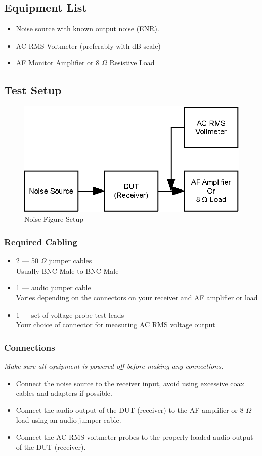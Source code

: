 \documentclass[10pt,letterpaper]{book}
\begin{document}
\subsection*{Equipment List}
\begin{itemize}
	\item Noise source with known output noise (ENR).
	\item AC RMS Voltmeter (preferably with dB scale)
	\item AF Monitor Amplifier or 8 $\Omega$ Resistive Load
\end{itemize}
\subsection*{Test Setup}
\begin{figure}[h]
\centering
\includegraphics[scale=1]{Illustrations/NFSetup}
\caption{Noise Figure Setup}
\end{figure}
\subsubsection*{Required Cabling}
\begin{itemize}
		\item 2 --- 50 $\Omega$ jumper cables \\
		Usually BNC Male-to-BNC Male
	\item 1 --- audio jumper cable \\
		Varies depending on the connectors on your receiver and AF amplifier or load
	\item 1 --- set of voltage probe test leads \\
		Your choice of connector for measuring AC RMS voltage output
\end{itemize}
\subsubsection*{Connections}
\emph{Make sure all equipment is powered off before making any connections.}
\begin{itemize}
\item Connect the noise source to the receiver input, avoid using excessive coax cables and adapters if possible.
	\item Connect the audio output of the DUT (receiver) to the AF amplifier or 8 $\Omega$ load using an audio jumper cable.
	\item Connect the AC RMS voltmeter probes to the properly loaded audio output of the DUT (receiver).
\end{itemize}
\end{document}
